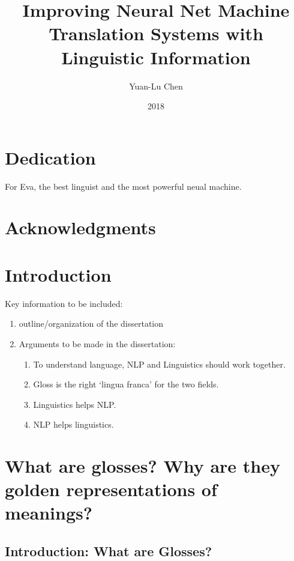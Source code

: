 \documentclass[final]{ua-thesis}
\author{Yuan-Lu Chen}
\title{Improving Neural Net Machine Translation Systems with Linguistic Information}
\date{2018}
\numberwithin{equation}{section}
\begin{document}


\maketitle

\chapter*{Dedication}
\thispagestyle{topright}
\begin{center}For Eva, the best linguist and the most powerful neual machine.\end{center}
\chapter*{Acknowledgments}


\tableofcontents
\listoffigures
\listoftables


%

\printindex

\chapter{Introduction}
\label{chap:Introduction}

Key information to be included:
\begin{enumerate}
\item outline/organization of the dissertation 
\item Arguments to be made in the dissertation: 
	\begin{enumerate}
	\item To understand language, NLP and Linguistics should work together.
    \item  Gloss is the right `lingua franca' for the two fields.
    \item Linguistics helps NLP.
    \item NLP helps linguistics. 
	\end{enumerate}
\end{enumerate}
\chapter{What are glosses? Why are they golden representations of meanings?}
\label{chap:gloss}

\section{Introduction: What are Glosses?}
\end{document}
